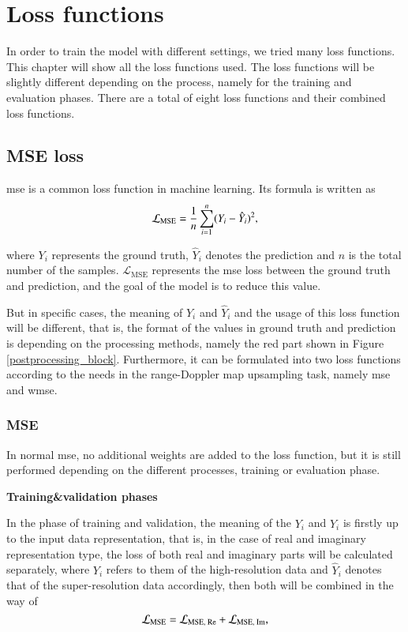 \chapter{Loss functions} \label{loss functions}
In order to train the model with different settings, we tried many loss functions. This chapter will show all the loss functions used. The loss functions will be slightly different depending on the process, namely for the training and evaluation phases. There are a total of eight loss functions and their combined loss functions.

\section{MSE loss} \label{mse loss}
\gls{mse} is a common loss function in machine learning. Its formula is written as
\begin{equation}
    \centering
    \mathcal{L}_{\text{MSE}} = \frac{1}{n} \sum_{i=1}^{n} (Y_i - \hat{Y}_i)^2,
\end{equation}

where $Y_i$ represents the ground truth, $\hat{Y}_i$ denotes the prediction and $n$ is the total number of the samples. $\mathcal{L}_{\text{MSE}}$ represents the \gls{mse} loss between the ground truth and prediction, and the goal of the model is to reduce this value. 

But in specific cases, the meaning of $Y_i$ and $\hat{Y}_i$ and the usage of this loss function will be different, that is, the format of the values in ground truth and prediction is depending on the processing methods, namely the red part shown in Figure \ref{postprocessing_block}. Furthermore, it can be formulated into two loss functions according to the needs in the range-Doppler map upsampling task, namely \gls{mse} and \gls{wmse}.

\subsection{MSE} \label{mse subsection}
In normal \gls{mse}, no additional weights are added to the loss function, but it is still performed depending on the different processes, training or evaluation phase.

\begin{spacing}{1.5}
\textbf{\large{Training\&validation phases}}
\end{spacing}
In the phase of training and validation, the meaning of the $Y_i$ and $\hat{Y}_i$ is firstly up to the input data representation, that is, in the case of real and imaginary representation type, the loss of both real and imaginary parts will be calculated separately, where $Y_i$ refers to them of the high-resolution data and $\hat{Y}_i$ denotes that of the super-resolution data accordingly, then both will be combined in the way of
\begin{equation}
    \centering
    \mathcal{L}_{\text{MSE}} = \mathcal{L}_{\text{MSE, Re}} + \mathcal{L}_{\text{MSE, Im}},
\end{equation}

